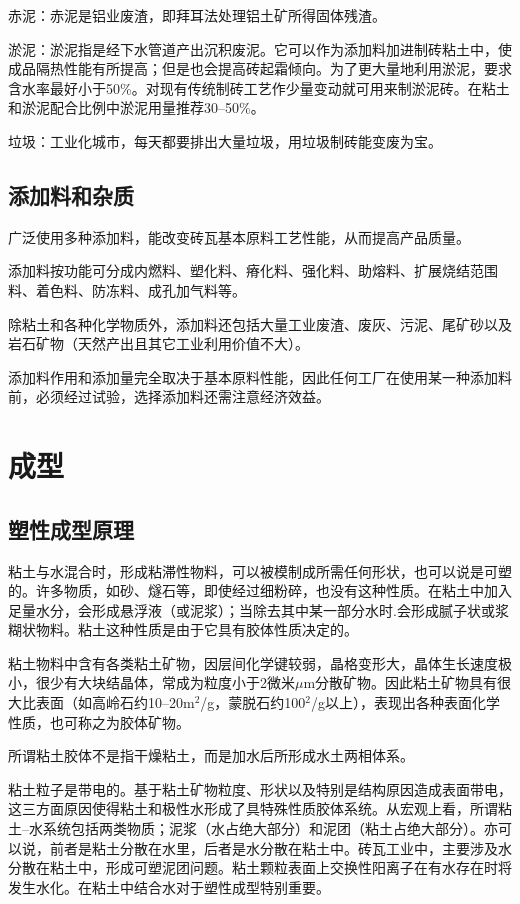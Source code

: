 \documentclass{ctexbook}
\begin{document}
赤泥：赤泥是铝业废渣，即拜耳法处理铝土矿所得固体残渣。

淤泥：淤泥指是经下水管道产出沉积废泥。它可以作为添加料加进制砖粘土中，使成品隔热性能有所提高；但是也会提高砖起霜倾向。为了更大量地利用淤泥，要求含水率最好小于50\%。对现有传统制砖工艺作少量变动就可用来制淤泥砖。在粘土和淤泥配合比例中淤泥用量推荐30--50\%。

垃圾：工业化城市，每天都要排出大量垃圾，用垃圾制砖能变废为宝。	
\subsection{添加料和杂质}
广泛使用多种添加料，能改变砖瓦基本原料工艺性能，从而提高产品质量。

添加料按功能可分成内燃料、塑化料、瘠化料、强化料、助熔料、扩展烧结范围料、着色料、防冻料、成孔加气料等。

除粘土和各种化学物质外，添加料还包括大量工业废渣、废灰、污泥、尾矿砂以及岩石矿物（天然产出且其它工业利用价值不大）。

添加料作用和添加量完全取决于基本原料性能，因此任何工厂在使用某一种添加料前，必须经过试验，选择添加料还需注意经济效益。
\section{成型}
\subsection{塑性成型原理}
粘土与水混合时，形成粘滞性物料，可以被模制成所需任何形状，也可以说是可塑的。许多物质，如砂、燧石等，即使经过细粉碎，也没有这种性质。在粘土中加入足量水分，会形成悬浮液（或泥浆）；当除去其中某一部分水时.会形成腻子状或浆糊状物料。粘土这种性质是由于它具有胶体性质决定的。

粘土物料中含有各类粘土矿物，因层间化学键较弱，晶格变形大，晶体生长速度极小，很少有大块结晶体，常成为粒度小于2微米$\mu$m分散矿物。因此粘土矿物具有很大比表面（如高岭石约10--20m$^2$/g，蒙脱石约100$^2$/g以上），表现出各种表面化学性质，也可称之为胶体矿物。

所谓粘土胶体不是指干燥粘土，而是加水后所形成水土两相体系。

粘土粒子是带电的。基于粘土矿物粒度、形状以及特别是结构原因造成表面带电，这三方面原因使得粘土和极性水形成了具特殊性质胶体系统。从宏观上看，所谓粘土--水系统包括两类物质；泥浆（水占绝大部分）和泥团（粘土占绝大部分）。亦可以说，前者是粘土分散在水里，后者是水分散在粘土中。砖瓦工业中，主要涉及水分散在粘土中，形成可塑泥团问题。粘土颗粒表面上交换性阳离子在有水存在时将发生水化。在粘土中结合水对于塑性成型特别重要。
\end{document}
